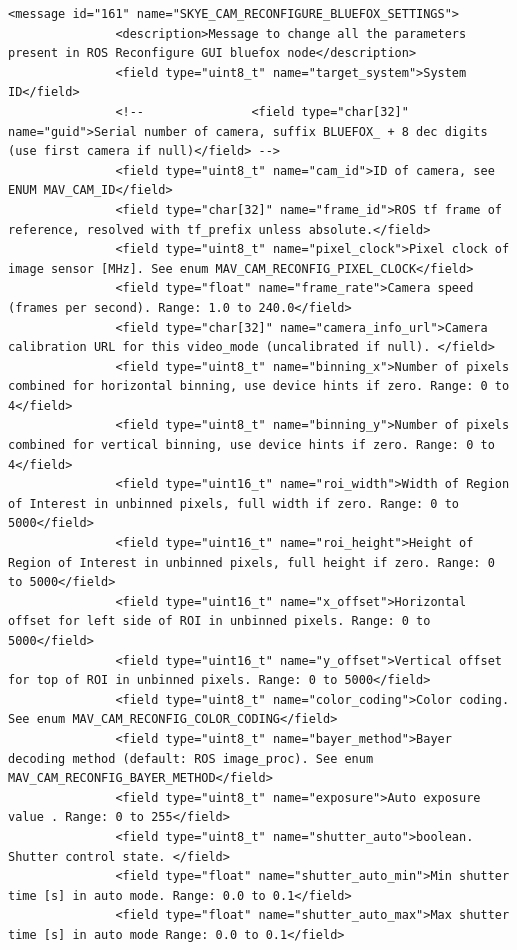 \begin{lstlisting}[captionpos=b, caption="Definition of \textsc{Skye} specific Mavlink messages", label=app_xml]
          <message id="161" name="SKYE_CAM_RECONFIGURE_BLUEFOX_SETTINGS">
               <description>Message to change all the parameters present in ROS Reconfigure GUI bluefox node</description>
               <field type="uint8_t" name="target_system">System ID</field>
               <!--               <field type="char[32]" name="guid">Serial number of camera, suffix BLUEFOX_ + 8 dec digits (use first camera if null)</field> -->
               <field type="uint8_t" name="cam_id">ID of camera, see ENUM MAV_CAM_ID</field>
               <field type="char[32]" name="frame_id">ROS tf frame of reference, resolved with tf_prefix unless absolute.</field>
               <field type="uint8_t" name="pixel_clock">Pixel clock of image sensor [MHz]. See enum MAV_CAM_RECONFIG_PIXEL_CLOCK</field>
               <field type="float" name="frame_rate">Camera speed (frames per second). Range: 1.0 to 240.0</field>
               <field type="char[32]" name="camera_info_url">Camera calibration URL for this video_mode (uncalibrated if null). </field>
               <field type="uint8_t" name="binning_x">Number of pixels combined for horizontal binning, use device hints if zero. Range: 0 to 4</field>
               <field type="uint8_t" name="binning_y">Number of pixels combined for vertical binning, use device hints if zero. Range: 0 to 4</field>
               <field type="uint16_t" name="roi_width">Width of Region of Interest in unbinned pixels, full width if zero. Range: 0 to 5000</field>
               <field type="uint16_t" name="roi_height">Height of Region of Interest in unbinned pixels, full height if zero. Range: 0 to 5000</field>
               <field type="uint16_t" name="x_offset">Horizontal offset for left side of ROI in unbinned pixels. Range: 0 to 5000</field>
               <field type="uint16_t" name="y_offset">Vertical offset for top of ROI in unbinned pixels. Range: 0 to 5000</field>
               <field type="uint8_t" name="color_coding">Color coding. See enum MAV_CAM_RECONFIG_COLOR_CODING</field>
               <field type="uint8_t" name="bayer_method">Bayer decoding method (default: ROS image_proc). See enum MAV_CAM_RECONFIG_BAYER_METHOD</field>
               <field type="uint8_t" name="exposure">Auto exposure value . Range: 0 to 255</field>
               <field type="uint8_t" name="shutter_auto">boolean. Shutter control state. </field>
               <field type="float" name="shutter_auto_min">Min shutter time [s] in auto mode. Range: 0.0 to 0.1</field>
               <field type="float" name="shutter_auto_max">Max shutter time [s] in auto mode Range: 0.0 to 0.1</field>

\end{lstlisting}
